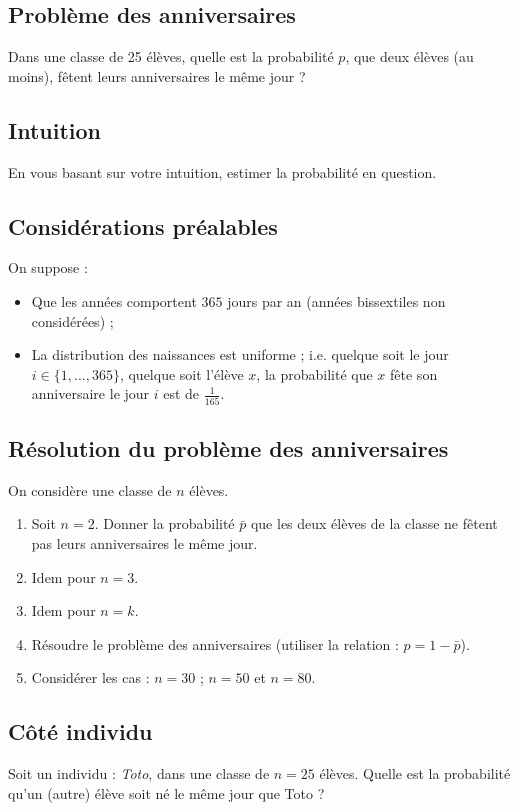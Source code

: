 


\subsection{Problème des anniversaires}
Dans une classe de 25 élèves, 
quelle est la probabilité $p$, que deux élèves (au moins), 
fêtent leurs anniversaires le même jour ? 


\subsection{Intuition}
En vous basant sur votre intuition, estimer la probabilité en question.


\subsection{Considérations préalables}
On suppose :
\begin{itemize}
	\item  Que les années comportent $365$ jours par an 
	(années bissextiles non considérées) ; 
	\item La distribution des naissances est uniforme ; 
	i.e. quelque soit le jour $i\in \{1, ..., 365\}$, 
	quelque soit l'élève $x$, 
	la probabilité que $x$ fête son anniversaire le jour $i$
	est de $\frac{1}{165}$.
\end{itemize}


\subsection{Résolution du problème des anniversaires}
On considère une classe de $n$ élèves.
\begin{enumerate}
	\item Soit $n=2$. Donner la probabilité $\bar{p}$ que les deux élèves de la
	classe ne fêtent pas leurs anniversaires le même jour.
	
	\item Idem pour $n=3$.
	
	\item Idem pour $n=k$.
	
	\item 
	Résoudre le problème des anniversaires
	(utiliser la relation : $p=1-\bar{p}$).
	
	
	\item Considérer les cas : $n=30$ ; $n=50$ et $n=80$.
\end{enumerate}

\subsection{Côté individu}
Soit un individu : \textit{Toto}, dans une classe de $n=25$ élèves.
Quelle est la probabilité qu'un (autre) élève soit né le même jour que Toto ?

